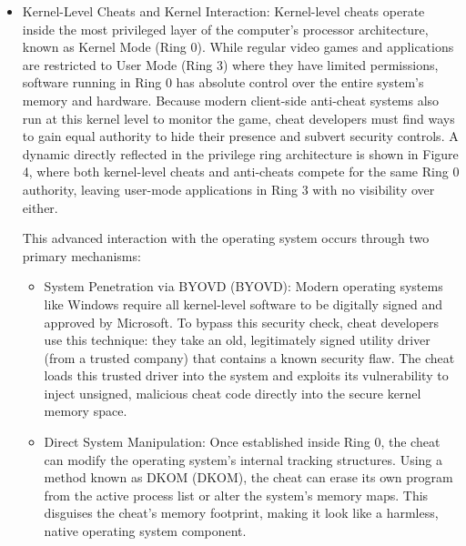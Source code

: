 \begin{itemize}
    \item Kernel-Level Cheats and Kernel Interaction: Kernel-level cheats operate inside the most privileged layer of the computer's processor architecture, known as Kernel Mode (Ring 0). While regular video games and applications are restricted to User Mode (Ring 3) where they have limited permissions, software running in Ring 0 has absolute control over the entire system's memory and hardware. Because modern client-side anti-cheat systems also run at this kernel level to monitor the game, cheat developers must find ways to gain equal authority to hide their presence and subvert security controls. A dynamic directly reflected in the privilege ring architecture is shown in Figure 4, where both kernel-level cheats and anti-cheats compete for the same Ring 0 authority, leaving user-mode applications in Ring 3 with no visibility over either.

    This advanced interaction with the operating system occurs through two primary mechanisms:

    \begin{itemize}
        \item System Penetration via \gls{BYOVD} (BYOVD): Modern operating systems like Windows require all kernel-level software to be digitally signed and approved by \gls{Microsoft}. To bypass this security check, cheat developers use this technique: they take an old, legitimately signed utility driver (from a trusted company) that contains a known security flaw. The cheat loads this trusted driver into the system and exploits its vulnerability to inject unsigned, malicious cheat code directly into the secure kernel memory space.
        \item Direct System Manipulation: Once established inside Ring 0, the cheat can modify the operating system's internal tracking structures. Using a method known as  \gls{DKOM} (DKOM), the cheat can erase its own program from the active process list or alter the system’s memory maps. This disguises the cheat's memory footprint, making it look like a harmless, native operating system component.
    \end{itemize}


\end{itemize}
